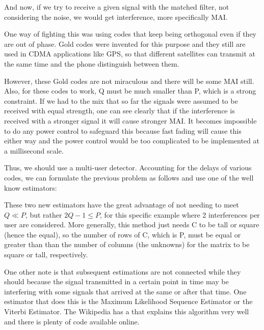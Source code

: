 \documentclass[12pt, a4paper]{article}
\begin{document}

\par And now, if we try to receive a given signal with the matched filter, not considering the noise, we would get interference, more specifically MAI.

\par One way of fighting this was using codes that keep being orthogonal even if they are out of phase. Gold codes were invented for this purpose and they still are used in CDMA applications like GPS, so that different satellites can transmit at the same time and the phone distinguish between them.

\par However, these Gold codes are not miraculous and there will be some MAI still. Also, for these codes to work, Q must be much smaller than P, which is a strong constraint. If we had to the mix that so far the signals were assumed to be received with equal strength, one can see clearly that if the interference is received with a stronger signal it will cause stronger MAI. It becomes impossible to do any power control to safeguard this because fast fading will cause this either way and the power control would be too complicated to be implemented at a millisecond scale.

\par Thus, we should use a multi-user detector. Accounting for the delays of various codes, we can formulate the previous problem as follows and use one of the well know estimators:


\par These two new estimators have the great advantage of not needing to meet $Q \ll P$, but rather $2Q-1 \leq P$, for this specific example where 2 interferences per user are considered. More generally, this method just needs C to be tall or square (hence the equal), so the number of rows of C, which is P, must be equal or greater than than the number of columns (the unknowns) for the matrix to be square or tall, respectively.

\par One other note is that subsequent estimations are not connected while they should because the signal transmitted in a certain point in time may be interfering with some signals that arrived at the same or after that time. One estimator that does this is the Maximum Likelihood Sequence Estimator or the Viterbi Estimator. The Wikipedia has a  that explains this algorithm very well and there is plenty of code available online.
\end{document}
